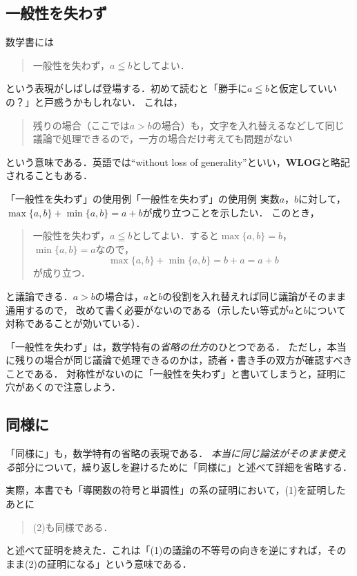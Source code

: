 \subsection{一般性を失わず}

数学書には
\begin{quote}
  一般性を失わず，$a \leqq b$としてよい．
\end{quote}
という表現がしばしば登場する．初めて読むと「勝手に$a \leqq b$と仮定していいの？」と戸惑うかもしれない．
これは，
\begin{quote}
  残りの場合（ここでは$a > b$の場合）も，文字を入れ替えるなどして同じ議論で処理できるので，一方の場合だけ考えても問題がない
\end{quote}
という意味である．英語では``without loss of generality''といい，\textbf{WLOG}と略記されることもある．

\begin{example}{「一般性を失わず」の使用例}{「一般性を失わず」の使用例}
  実数$a$，$b$に対して，$\max\{a,b\} + \min\{a,b\} = a+b$が成り立つことを示したい．
  このとき，
  \begin{quote}
    一般性を失わず，$a \leqq b$としてよい．すると$\max\{a,b\}=b$，$\min\{a,b\}=a$なので，
    \[
      \max\{a,b\} + \min\{a,b\} = b + a = a + b
    \]
    が成り立つ．
  \end{quote}
  と議論できる．$a > b$の場合は，$a$と$b$の役割を入れ替えれば同じ議論がそのまま通用するので，
  改めて書く必要がないのである（示したい等式が$a$と$b$について対称であることが効いている）．
\end{example}

「一般性を失わず」は，数学特有の\emph{省略の仕方}のひとつである．
ただし，本当に残りの場合が同じ議論で処理できるのかは，読者・書き手の双方が確認すべきことである．
対称性がないのに「一般性を失わず」と書いてしまうと，証明に穴があくので注意しよう．

\subsection{同様に}

「同様に」も，数学特有の省略の表現である．
\emph{本当に同じ論法がそのまま使える}部分について，繰り返しを避けるために「同様に」と述べて詳細を省略する．

実際，本書でも「導関数の符号と単調性」の系の証明において，(1)を証明したあとに
\begin{quote}
  (2)も同様である．
\end{quote}
と述べて証明を終えた．これは「(1)の議論の不等号の向きを逆にすれば，そのまま(2)の証明になる」という意味である．


